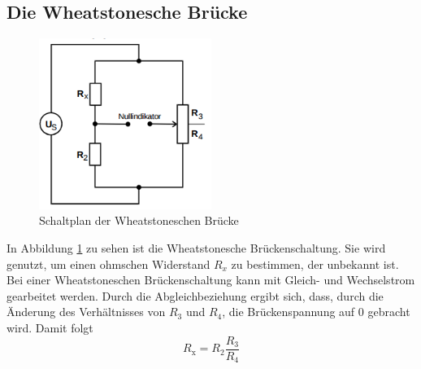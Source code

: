 \documentclass[
  bibliography=totoc,     %
  captions=tableheading,  %
  titlepage=firstiscover, %
]{scrartcl}
\begin{document}
\subsection{Die Wheatstonesche Brücke}
\begin{figure}[htb]
  \centering
  \includegraphics[width=0.5\textwidth]{V3022.png}
  \caption{Schaltplan der Wheatstoneschen Brücke}
  \label{fig:V3022}
\end{figure}
In Abbildung \ref{fig:V3022} zu sehen ist die Wheatstonesche Brückenschaltung.
Sie wird genutzt, um einen ohmschen Widerstand $R_x$ zu bestimmen, der unbekannt
ist. Bei einer Wheatstoneschen Brückenschaltung kann mit Gleich- und
Wechselstrom gearbeitet werden. Durch die Abgleichbeziehung ergibt sich,
dass, durch die Änderung des Verhältnisses von $R_3$ und $R_4$, die
Brückenspannung auf 0 gebracht wird. Damit folgt
\begin{equation}
    \label{eq:wheatstone}
    R_{\mathup{x}} = R_2 \frac{R_3}{R_4}
\end{equation}
\newpage
\end{document}
